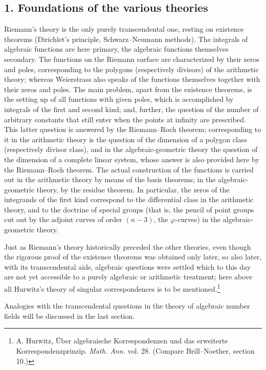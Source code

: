 \documentclass[11pt]{article}
\begin{document}
\subsection*{1. Foundations of the various theories}
Riemann's theory is the only purely transcendental one, resting on existence theorems (Dirichlet's principle, Schwarz--Neumann methods). The integrals of algebraic functions are here primary, the algebraic functions themselves secondary. The functions on the Riemann surface are characterized by their zeros and poles, corresponding to the polygons (respectively divisors) of the arithmetic theory; whereas Weierstrass also speaks of the functions themselves together with their zeros and poles. The main problem, apart from the existence theorems, is the setting up of all functions with given poles, which is accomplished by integrals of the first and second kind; and, further, the question of the number of arbitrary constants that still enter when the points at infinity are prescribed. This latter question is answered by the Riemann--Roch theorem; corresponding to it in the arithmetic theory is the question of the dimension of a polygon class (respectively divisor class), and in the algebraic-geometric theory the question of the dimension of a complete linear system, whose answer is also provided here by the Riemann--Roch theorem. The actual construction of the functions is carried out in the arithmetic theory by means of the basis theorems; in the algebraic-geometric theory, by the residue theorem. In particular, the zeros of the integrands of the first kind correspond to the differential class in the arithmetic theory, and to the doctrine of special groups (that is, the pencil of point groups cut out by the adjoint curves of order \((n-3)\), the \(\varphi\)-curves) in the algebraic-geometric theory.

Just as Riemann's theory historically preceded the other theories, even though the rigorous proof of the existence theorems was obtained only later, so also later, with its transcendental aids, algebraic questions were settled which to this day are not yet accessible to a purely algebraic or arithmetic treatment; here above all Hurwitz's theory of singular correspondences is to be mentioned.\footnote{A. Hurwitz, Über algebraische Korrespondenzen und das erweiterte Korrespondenzprinzip. \emph{Math. Ann.} vol. 28. (Compare Brill--Noether, section 10.)}

Analogies with the transcendental questions in the theory of algebraic number fields will be discussed in the last section.
\end{document}
